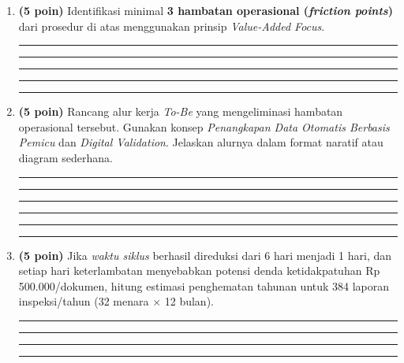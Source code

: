 \documentclass[12pt,a4paper]{report}
\begin{document}
\vspace{0.3cm}

\begin{enumerate}[leftmargin=*, label=\textbf{D1.\alph*}]
    \item \textbf{(5 poin)} Identifikasi minimal \textbf{3 hambatan operasional (\textit{friction points})} dari prosedur di atas menggunakan prinsip \textit{Value-Added Focus}.

\vspace{0.2cm}
\noindent\rule{\textwidth}{0.3pt}
\vspace{0.5cm}
\noindent\rule{\textwidth}{0.3pt}
\vspace{0.5cm}
\noindent\rule{\textwidth}{0.3pt}
\vspace{0.5cm}
\noindent\rule{\textwidth}{0.3pt}
\vspace{0.5cm}
\noindent\rule{\textwidth}{0.3pt}

    \item \textbf{(5 poin)} Rancang alur kerja \textit{To-Be} yang mengeliminasi hambatan operasional tersebut. Gunakan konsep \textit{Penangkapan Data Otomatis Berbasis Pemicu} dan \textit{Digital Validation}. Jelaskan alurnya dalam format naratif atau diagram sederhana.

\vspace{0.2cm}
\noindent\rule{\textwidth}{0.3pt}
\vspace{0.5cm}
\noindent\rule{\textwidth}{0.3pt}
\vspace{0.5cm}
\noindent\rule{\textwidth}{0.3pt}
\vspace{0.5cm}
\noindent\rule{\textwidth}{0.3pt}
\vspace{0.5cm}
\noindent\rule{\textwidth}{0.3pt}
\vspace{0.5cm}
\noindent\rule{\textwidth}{0.3pt}

    \item \textbf{(5 poin)} Jika \textit{waktu siklus} berhasil direduksi dari 6 hari menjadi 1 hari, dan setiap hari keterlambatan menyebabkan potensi denda ketidakpatuhan Rp 500.000/dokumen, hitung estimasi penghematan tahunan untuk 384 laporan inspeksi/tahun (32 menara $\times$ 12 bulan).

\vspace{0.2cm}
\noindent\rule{\textwidth}{0.3pt}
\vspace{0.5cm}
\noindent\rule{\textwidth}{0.3pt}
\vspace{0.5cm}
\noindent\rule{\textwidth}{0.3pt}
\vspace{0.5cm}
\noindent\rule{\textwidth}{0.3pt}
\end{enumerate}
\end{document}

